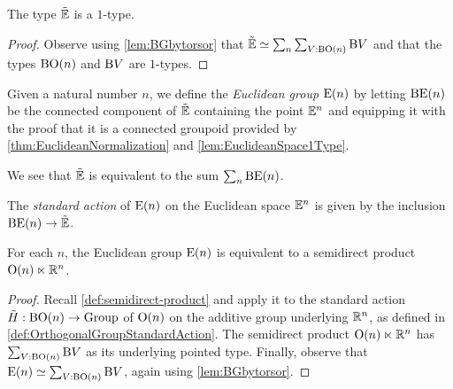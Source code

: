 \begin{lemma}\label{lem:EuclideanSpace1Type}
  The type ${\tilde {\mathbb E}}$ is a $1$-type.
\end{lemma}

\begin{proof}
  Observe using \cref{lem:BGbytorsor} that
  ${\tilde {\mathbb E}} \simeq \sum_n \sum_{V:\mathrm{B} \mathrm{O}(n)} \mathrm{B} V$ and that the
  types $\mathrm{B} \mathrm{O}(n)$ and $\mathrm{B} V$ are $1$-types.
\end{proof}

\begin{definition}\label{def:EuclideanGroup}
  Given a natural number $n$, we define the {\em Euclidean group} $\mathrm{E}(n)$ by
  letting $\mathrm{B} \mathrm{E}(n)$ be the connected component of ${\tilde {\mathbb E}}$ containing the
  point $\mathbb E^n$ and equipping it with the proof that it is a connected
  groupoid provided by \cref{thm:EuclideanNormalization} and
  \cref{lem:EuclideanSpace1Type}.
\end{definition}

We see that ${\tilde {\mathbb E}}$ is equivalent to the sum $\sum_n \mathrm{B} \mathrm{E}(n)$.

\begin{definition}\label{def:EuclideanGroupStandardAction}
  The {\em standard action} of $\mathrm{E}(n)$ on the Euclidean space $\mathbb E^n$ is given
  by the inclusion $\mathrm{B} \mathrm{E}(n) \to {\tilde {\mathbb E}}$.
\end{definition}

\begin{theorem}\label{thm:EuclideanGroupSemidirect}
  For each $n$, the Euclidean group $\mathrm{E}(n)$ is equivalent to a semidirect
  product $\mathrm{O}(n) \ltimes \mathbb{R}^n$.
\end{theorem}

\begin{proof}
  Recall \cref{def:semidirect-product} and apply it to the standard action
  $\tilde H : \mathrm{B} \mathrm{O}(n) \to \mathrm{Group}$ of $\mathrm{O}(n)$ on the additive group
  underlying $\mathbb{R}^n$, as defined in \cref{def:OrthogonalGroupStandardAction}.
  The semidirect product $\mathrm{O}(n) \ltimes \mathbb{R}^n$ has
  $\sum_{V:\mathrm{B} \mathrm{O}(n)} \mathrm{B} V$ as its underlying pointed type.
  Finally, observe that $\mathrm{E}(n) \simeq \sum_{V:\mathrm{B} \mathrm{O}(n)} \mathrm{B} V$, again
  using \cref{lem:BGbytorsor}.
\end{proof}
